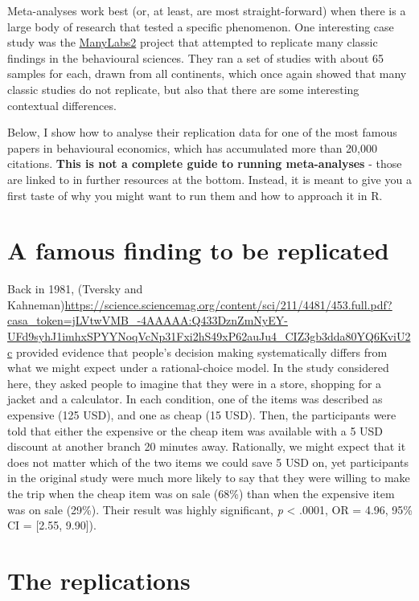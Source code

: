 \documentclass[
]{book}
\begin{document}
Meta-analyses work best (or, at least, are most straight-forward) when there is a large body of research that tested a specific phenomenon. One interesting case study was the \href{https://journals-sagepub-com.gold.idm.oclc.org/doi/pdf/10.1177/2515245918810225}{ManyLabs2} project that attempted to replicate many classic findings in the behavioural sciences. They ran a set of studies with about 65 samples for each, drawn from all continents, which once again showed that many classic studies do not replicate, but also that there are some interesting contextual differences.

Below, I show how to analyse their replication data for one of the most famous papers in behavioural economics, which has accumulated more than 20,000 citations. \textbf{This is not a complete guide to running meta-analyses} - those are linked to in further resources at the bottom. Instead, it is meant to give you a first taste of why you might want to run them and how to approach it in R.

\hypertarget{a-famous-finding-to-be-replicated}{%
\section{A famous finding to be replicated}\label{a-famous-finding-to-be-replicated}}

Back in 1981, (Tversky and Kahneman){\url{https://science.sciencemag.org/content/sci/211/4481/453.full.pdf?casa_token=jLVtwVMB_-4AAAAA:Q433DznZmNyEY-UFd9syhJ1imhxSPYYNoqVcNp31Fxi2hS49xP62auJu4_CIZ3gb3dda80YQ6KviU2c}} provided evidence that people's decision making systematically differs from what we might expect under a rational-choice model. In the study considered here, they asked people to imagine that they were in a store, shopping for a jacket and a calculator. In each condition, one of the items was described as expensive (125 USD), and one as cheap (15 USD). Then, the participants were told that either the expensive or the cheap item was available with a 5 USD discount at another branch 20 minutes away. Rationally, we might expect that it does not matter which of the two items we could save 5 USD on, yet participants in the original study were much more likely to say that they were willing to make the trip when the cheap item was on sale (68\%) than when the expensive item was on sale (29\%). Their result was highly significant, \emph{p} \textless{} .0001, OR = 4.96, 95\% CI = {[}2.55, 9.90{]}).

\hypertarget{the-replications}{%
\section{The replications}\label{the-replications}}
\end{document}
